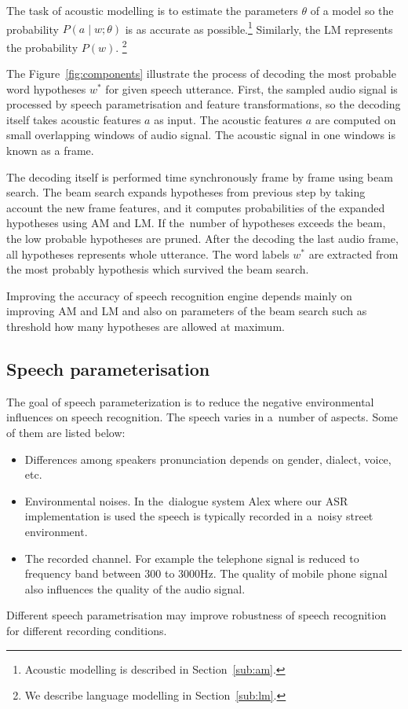 The task of acoustic modelling is to estimate the parameters $\theta$ of a model so the probability $P(a \mid w ; \theta)$ is as accurate as possible.\footnote{Acoustic modelling is described in Section~\ref{sub:am}.} 
Similarly, the \ac{LM} represents the probability $P(w)$. \footnote{We describe language modelling in Section~\ref{sub:lm}.}

The Figure~\ref{fig:components} illustrate the process of decoding the most probable word hypotheses $w^*$ for given speech utterance. 
First, the sampled audio signal is processed by speech parametrisation and feature transformations, so the decoding itself takes acoustic features $a$ as input. The acoustic features $a$ are computed on small overlapping windows of audio signal.
The acoustic signal in one windows is known as a frame.

The decoding itself is performed time synchronously frame by frame using beam search.
The beam search expands hypotheses from previous step by taking account the new frame features, and it computes probabilities of the expanded hypotheses using \ac{AM} and \ac{LM}.
If the~number of hypotheses exceeds the beam, the low probable hypotheses are pruned.
After the decoding the last audio frame, all hypotheses represents whole utterance.
The word labels $w^*$ are extracted from the most probably hypothesis which survived the beam search.

Improving the accuracy of speech recognition engine depends mainly on improving \ac{AM} and \ac{LM}
and also on parameters of the beam search such as threshold how many hypotheses are allowed at maximum.


\subsection{Speech parameterisation}
\label{sub:param}
The goal of speech parameterization is to reduce the negative environmental influences on speech recognition.
The speech varies in a~number of aspects. Some of them are listed below:
\begin{itemize}
    \item Differences among speakers pronunciation depends on gender, dialect, voice, etc.
    \item Environmental noises. In the~dialogue system Alex where our \ac{ASR} implementation is used the speech is typically recorded in a~noisy street environment.
    \item The recorded channel.
        For example the telephone signal is reduced to frequency band between 300 to 3000Hz.
        The quality of mobile phone signal also influences the quality of the audio signal.
\end{itemize}
Different speech parametrisation may improve robustness of speech recognition for different recording conditions.


